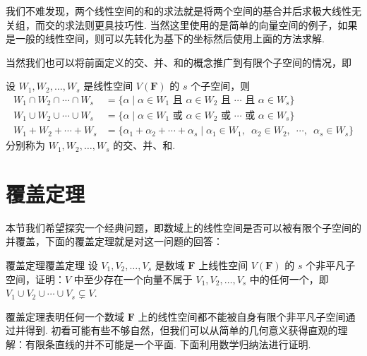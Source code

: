我们不难发现，两个线性空间的和的求法就是将两个空间的基合并后求极大线性无关组，而交的求法则更具技巧性. 当然这里使用的是简单的向量空间的例子，如果是一般的线性空间，则可以先转化为基下的坐标然后使用上面的方法求解.

当然我们也可以将前面定义的交、并、和的概念推广到有限个子空间的情况，即
\begin{definition}{}{}
    设 $W_1,W_2,\ldots,W_s$ 是线性空间 $V(\mathbf{F})$ 的 $s$ 个子空间，则
    \begin{align*}
        W_1 \cap W_2 \cap \cdots \cap W_s & =\{\alpha \mid \alpha\in W_1 \text{~且~} \alpha\in W_2 \text{~且~} \cdots \text{~且~} \alpha\in W_s\} \\
        W_1 \cup W_2 \cup \cdots \cup W_s & =\{\alpha \mid \alpha\in W_1 \text{~或~} \alpha\in W_2 \text{~或~} \cdots \text{~或~} \alpha\in W_s\} \\
        W_1 + W_2 + \cdots + W_s          & =\{\alpha_1+\alpha_2+\cdots+\alpha_s \mid \alpha_1\in W_1,\enspace\alpha_2\in W_2,\enspace\cdots,\enspace\alpha_s\in W_s\}
    \end{align*}
    分别称为 $W_1,W_2,\ldots,W_s$ 的交、并、和.
\end{definition}

\section{覆盖定理}

本节我们希望探究一个经典问题，即数域上的线性空间是否可以被有限个子空间的并覆盖，下面的覆盖定理就是对这一问题的回答：

\begin{theorem}{覆盖定理}{覆盖定理} 
    设 $V_1,V_2,\ldots,V_s$ 是数域 $\mathbf{F}$ 上线性空间 $V(\mathbf{F})$ 的 $s$ 个非平凡子空间，证明：$V$ 中至少存在一个向量不属于 $V_1,V_2,\ldots,V_s$ 中的任何一个，即 $V_1 \cup V_2 \cup \cdots \cup V_s\subsetneq V$.
\end{theorem}

覆盖定理表明任何一个数域 $\mathbf{F}$ 上的线性空间都不能被自身有限个非平凡子空间通过并得到. 初看可能有些不够自然，但我们可以从简单的几何意义获得直观的理解：有限条直线的并不可能是一个平面. 下面利用数学归纳法进行证明.

